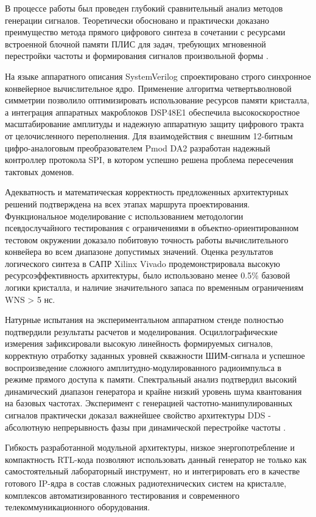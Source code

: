 \documentclass[12pt,a4paper,TimesNewRoman]{article}
\begin{document}
В процессе работы был проведен глубокий сравнительный анализ методов генерации сигналов. Теоретически обосновано и практически доказано преимущество метода прямого цифрового синтеза в сочетании с ресурсами встроенной блочной памяти ПЛИС для задач, требующих мгновенной перестройки частоты и формирования сигналов произвольной формы \cite{shunli, analog-dds}.

На языке аппаратного описания SystemVerilog спроектировано строго синхронное конвейерное вычислительное ядро. Применение алгоритма четвертьволновой симметрии позволило оптимизировать использование ресурсов памяти кристалла, а интеграция аппаратных макроблоков DSP48E1 \cite{dsp48e1} обеспечила высокоскоростное масштабирование амплитуды и надежную аппаратную защиту цифрового тракта от целочисленного переполнения. Для взаимодействия с внешним 12-битным цифро-аналоговым преобразователем Pmod DA2 \cite{dac121s101} разработан надежный контроллер протокола SPI, в котором успешно решена проблема пересечения тактовых доменов.

Адекватность и математическая корректность предложенных архитектурных решений подтверждена на всех этапах маршрута проектирования. Функциональное моделирование с использованием методологии псевдослучайного тестирования с ограничениями в объектно-ориентированном тестовом окружении доказало побитовую точность работы вычислительного конвейера во всем диапазоне допустимых значений. Оценка результатов логического синтеза в САПР Xilinx Vivado продемонстрировала высокую ресурсоэффективность архитектуры, было использовано менее 0.5\% базовой логики кристалла, и наличие значительного запаса по временным ограничениям WNS > 5 нс.

Натурные испытания на экспериментальном аппаратном стенде полностью подтвердили результаты расчетов и моделирования. Осциллографические измерения зафиксировали высокую линейность формируемых сигналов, корректную отработку заданных уровней скважности ШИМ-сигнала и успешное воспроизведение сложного амплитудно-модулированного радиоимпульса в режиме прямого доступа к памяти. Спектральный анализ подтвердил высокий динамический диапазон генератора и крайне низкий уровень шума квантования на базовых частотах. Эксперимент с генерацией частотно-манипулированных сигналов практически доказал важнейшее свойство архитектуры DDS - абсолютную непрерывность фазы при динамической перестройке частоты \cite{Vankka}.

Гибкость разработанной модульной архитектуры, низкое энергопотребление и компактность RTL-кода позволяют использовать данный генератор не только как самостоятельный лабораторный инструмент, но и интегрировать его в качестве готового IP-ядра в состав сложных радиотехнических систем на кристалле, комплексов автоматизированного тестирования и современного телекоммуникационного оборудования.
\end{document}
